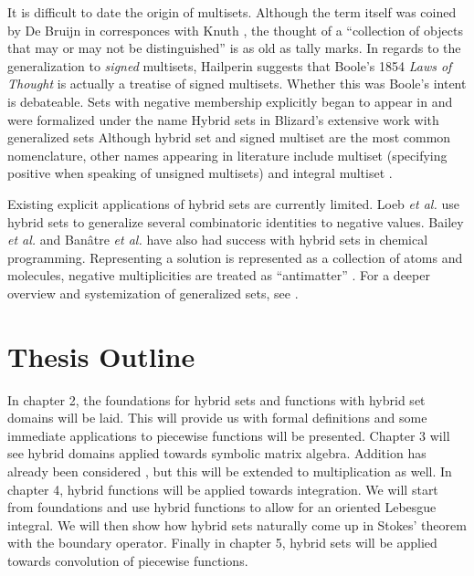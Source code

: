 It is difficult to date the origin of multisets.
Although the term itself was coined by De Bruijn in corresponces with Knuth \cite{knuth2014art},
the thought of a ``collection of objects that may or may not be distinguished'' is as old as tally marks. 
In regards to the generalization to \emph{signed} multisets, Hailperin \cite{hailperin1986boole} 
suggests that Boole's 1854 \emph{Laws of Thought} \cite{boole1854investigation} is actually a treatise of signed multisets.
Whether this was Boole's intent is debateable.
Sets with negative membership explicitly began to appear in \cite{whitney1933characteristic} and were 
formalized under the name Hybrid sets in Blizard's extensive work with generalized sets \cite{blizard1988, blizard1990} 
Although hybrid set and signed multiset are the most common nomenclature, other names appearing in literature include
multiset (specifying positive when speaking of unsigned multisets) \cite{reisig1985petri} 
and integral multiset \cite{wildberger2003new}. 


Existing explicit applications of hybrid sets are currently limited.
Loeb \emph{et al.} \cite{damiani1991, loeb1992} use hybrid sets to generalize several combinatoric identities to negative values.
Bailey \emph{et al.} \cite{bailey2009hypergraphic} and Ban\^{a}tre \emph{et al.} \cite{banatre2006} 
have also had success with hybrid sets in chemical programming. 
Representing a solution is represented as a collection of atoms and molecules, 
negative multiplicities are treated as ``antimatter'' . 
For a deeper overview and systemization of generalized sets, see \cite{singh2007, singh2008systematization}.





\section{Thesis Outline}


In chapter 2, the foundations for hybrid sets and functions with hybrid set domains will be laid. 
This will provide us with formal definitions and some immediate applications to piecewise functions will be presented.
Chapter 3 will see hybrid domains applied towards symbolic matrix algebra.
Addition has already been considered \cite{carette2010}, but this will be extended to multiplication as well.
In chapter 4, hybrid functions will be applied towards integration. 
We will start from foundations and use hybrid functions to allow for an oriented Lebesgue integral.
We will then show how hybrid sets naturally come up in Stokes' theorem with the boundary operator.
Finally in chapter 5, hybrid sets will be applied towards convolution of piecewise functions.


















